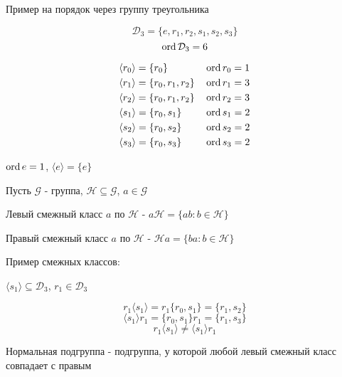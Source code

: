 \documentclass[../main/document.tex]{subfiles}
\begin{document}
\begin{exm}
Пример на порядок через группу треугольника

$$\mathcal{D}_3=\{e,r_1,r_2,s_1,s_2,s_3\}$$
$$\operatorname{ord} \mathcal{D}_3=6$$

\begin{align*}
&\langle r_0\rangle=\{r_0\} & &\operatorname{ord} r_0=1\\
&\langle r_1\rangle=\{r_0,r_1,r_2\} & &\operatorname{ord} r_1=3\\
&\langle r_2\rangle=\{r_0,r_1,r_2\} & &\operatorname{ord} r_2=3\\
&\langle s_1\rangle=\{r_0,s_1\} & &\operatorname{ord} s_1=2\\
&\langle s_2\rangle=\{r_0,s_2\} & &\operatorname{ord} s_2=2\\
&\langle s_3\rangle=\{r_0,s_3\} & &\operatorname{ord} s_3=2
\end{align*}

\end{exm}

\begin{cnsq}
$\operatorname{ord} e=1$, $\langle e\rangle=\{e\}$
\end{cnsq}
\begin{dfn}
Пусть $\mathcal{G}$ - группа, $\mathcal{H}\subseteq \mathcal{G}$, $a\in \mathcal{G}$

Левый смежный класс $a$ по $\mathcal{H}$ - $a\mathcal{H}=\{ab: b\in \mathcal{H}\}$

Правый смежный класс $a$ по $\mathcal{H}$ - $\mathcal{H}a=\{ba: b\in \mathcal{H}\}$
\end{dfn}

\begin{exm}
Пример смежных классов:

$\langle s_1\rangle \subseteq \mathcal{D}_3$, $r_1\in \mathcal{D}_3$

$$r_1\langle s_1\rangle = r_1\{r_0,s_1\}=\{r_1,s_2\}$$
$$\langle s_1\rangle r_1 = \{r_0,s_1\}r_1=\{r_1,s_3\}$$
$$r_1\langle s_1\rangle \neq \langle s_1\rangle r_1$$
\end{exm}

\begin{dfn}
Нормальная подгруппа - подгруппа, у которой любой левый смежный класс совпадает с правым
\end{dfn}
\end{document}
